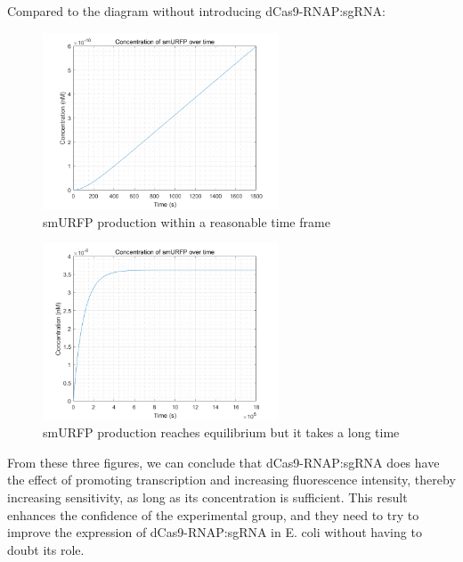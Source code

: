 Compared to the diagram without introducing dCas9-RNAP:sgRNA:

\begin{figure}[H]
	\centering
	\includegraphics[width=7cm]{21}
	\caption{smURFP production within a reasonable time frame}
\end{figure}
\begin{figure}[H]
	\centering
	\includegraphics[width=7cm]{22}
	\caption{smURFP production reaches equilibrium but it takes a long time}
\end{figure}

From these three figures, we can conclude that dCas9-RNAP:sgRNA does have the effect of promoting transcription and increasing fluorescence intensity, thereby increasing sensitivity, as long as its concentration is sufficient. This result enhances the confidence of the experimental group, and they need to try to improve the expression of dCas9-RNAP:sgRNA in E. coli without having to doubt its role.



